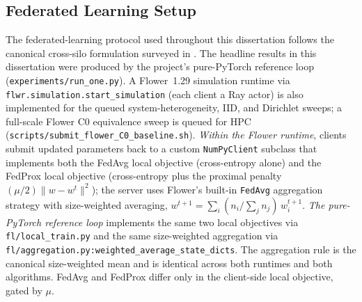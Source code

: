 \documentclass[11pt,a4paper]{article}
\begin{document}
\subsection{Federated Learning Setup}\label{sec:fl-setup}
The federated-learning protocol used throughout this dissertation
follows the canonical cross-silo formulation surveyed in
\citet{kairouz2021advances}. The headline results in this dissertation were produced by the project's
pure-PyTorch reference loop (\texttt{experiments/run\_one.py}). A
Flower~1.29 simulation runtime \citep{beutel2020flower} via
\texttt{flwr.simulation.start\_simulation} (each client a Ray actor) is
also implemented for the queued system-heterogeneity, IID, and Dirichlet
sweeps; a full-scale Flower C0 equivalence sweep is queued for HPC
(\texttt{scripts/submit\_flower\_C0\_baseline.sh}).
\emph{Within the Flower runtime}, clients submit updated parameters
back to a custom \texttt{NumPyClient} subclass that implements
both the FedAvg local objective (cross-entropy alone) and the FedProx
local objective (cross-entropy plus the proximal penalty
$(\mu/2)\lVert w - w^t \rVert^2$); the server uses Flower's
built-in \texttt{FedAvg} aggregation strategy with size-weighted
averaging, $w^{t+1} = \sum_i (n_i / \sum_j n_j)\, w_i^{t+1}$.
\emph{The pure-PyTorch reference loop} implements the same two
local objectives via \texttt{fl/local\_train.py} and the same
size-weighted aggregation via
\texttt{fl/aggregation.py:weighted\_average\_state\_dicts}. The
aggregation rule is the canonical size-weighted mean and is
identical across both runtimes and both algorithms. FedAvg and
FedProx differ only in the client-side local objective, gated
by $\mu$.
\end{document}
